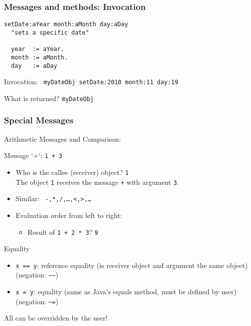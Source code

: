 \documentclass[handout]{beamer}
\newcommand{\Blue}[1]{\color{blue}#1\color{black}}
\begin{document}

\begin{frame}[fragile]
\frametitle{Messages and methods: Invocation}

\begin{example}
\begin{lstlisting}[language=Smalltalk]
setDate:aYear month:aMonth day:aDay 
  "sets a specific date"

  year  := aYear.
  month := aMonth.
  day   := aDay
\end{lstlisting}
\end{example}

Invocation:
\lstinline[language=Smalltalk]+ myDateObj setDate:2010 month:11 day:19+

\pause\bigskip

What is returned? \pause \texttt{myDateObj}

\end{frame}


\begin{frame}[fragile]
\frametitle{Special Messages}


\Blue{Arithmetic Messages and Comparison}:

Message `+`: \texttt{1 + 3}

\begin{itemize}
\item Who is the callee (receiver) object? \pause \texttt{1}\\
  The object \texttt{1} receives the message \texttt{+} with argument \texttt{3}.
\item Similar: \texttt{ -,*,/,\ldots,<,>,\ldots}
\item Evaluation order from left to right:
  \begin{itemize}
    \item Result of \texttt{1 + 2 * 3}? \pause \alert{\texttt{9}}
  \end{itemize}
\end{itemize}

\Blue{Equality}

\begin{itemize}
\item \texttt{x == y}: reference equality (is receiver object and
  argument the same object) (negation: \verb+~~+)
\item \texttt{x = y}: equality (same as Java's equals method, must be
  defined by user) (negation: \verb+~=+)
\end{itemize}
\pause

All can be overridden by the user!

\end{frame}
\end{document}
